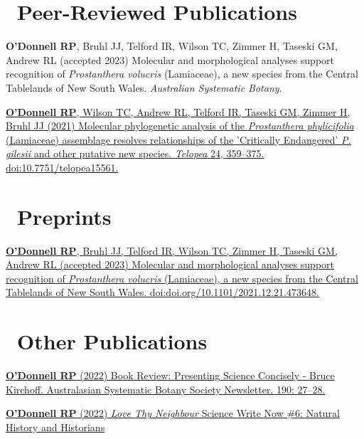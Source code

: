 \documentclass[10,a4paper,]{awesome-cv}
\begin{document}
\hypertarget{peer-reviewed-publications}{%
\section{\texorpdfstring{\acvHeaderIconSep~Peer-Reviewed
Publications}{~Peer-Reviewed Publications}}\label{peer-reviewed-publications}}

\textbf{O'Donnell RP}, Bruhl JJ, Telford IR, Wilson TC, Zimmer H,
Taseski GM, Andrew RL (accepted 2023) Molecular and morphological
analyses support recognition of \emph{Prostanthera volucris}
(Lamiaceae), a new species from the Central Tablelands of New South
Wales. \emph{Australian Systematic Botany}.

\href{https://openjournals.library.sydney.edu.au/index.php/TEL/article/view/15561}{\textbf{O'Donnell
RP}, Wilson TC, Andrew RL, Telford IR, Taseski GM, Zimmer H, Bruhl JJ
(2021) Molecular phylogenetic analysis of the \emph{Prostanthera
phylicifolia} (Lamiaceae) assemblage resolves relationships of the
'Critically Endangered' \emph{P. gilesii} and other putative new
species. \emph{Telopea} 24, 359--375. doi:10.7751/telopea15561.}

\hypertarget{preprints}{%
\section{\texorpdfstring{\acvHeaderIconSep~Preprints}{~Preprints}}\label{preprints}}

\href{https://doi.org/10.1101/2021.12.21.473648}{\textbf{O'Donnell RP},
Bruhl JJ, Telford IR, Wilson TC, Zimmer H, Taseski GM, Andrew RL
(accepted 2023) Molecular and morphological analyses support recognition
of \emph{Prostanthera volucris} (Lamiaceae), a new species from the
Central Tablelands of New South Wales.
doi:doi.org/10.1101/2021.12.21.473648.}

\hypertarget{other-publications}{%
\section{\texorpdfstring{\acvHeaderIconSep~Other
Publications}{~Other Publications}}\label{other-publications}}

\href{https://asbs.org.au/newsletter/pdf/22-mar-190.pdf}{\textbf{O'Donnell
RP} (2022) Book Review: Presenting Science Concisely - Bruce Kirchoff.
Australasian Systematic Botany Society Newsletter. 190: 27--28.}

\href{https://www.sciencewritenow.com/essays-craft-memoir/love-thy-neighbour}{\textbf{O'Donnell
RP} (2022) \emph{Love Thy Neighbour} Science Write Now \#6: Natural
History and Historians}
\end{document}
